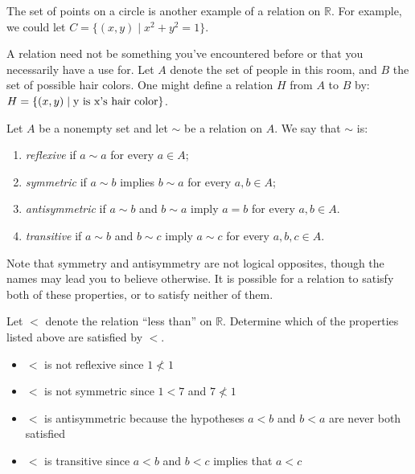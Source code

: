 \begin{example}
The set of points on a circle is another example of a relation on $\mathbb R$.  For example, we could let $C=\{(x,y)\mid x^2+y^2=1\}$.
\end{example}

\begin{example}
A relation need not be something you've encountered before or that you necessarily have a use for.  Let $A$ denote the set of people in this room, and $B$ the set of possible hair colors.  One might define a relation $H$ from $A$ to $B$ by: $H=\{ (x,y)\mid \hbox{y is x's hair color}\}$.
\end{example}

\begin{definition}
Let $A$ be a nonempty set and let $\sim$ be a relation on $A$.  We say that $\sim$ is:
\begin{enumerate}
\item \emph{reflexive} if $a\sim a$ for every $a\in A$;
\item \emph{symmetric} if $a\sim b$ implies $b\sim a$ for every $a,b\in A$;
\item \emph{antisymmetric} if $a\sim b$ and $b\sim a$ imply $a=b$ for every $a,b\in A$.
\item \emph{transitive} if $a\sim b$ and $b\sim c$ imply $a\sim c$ for every $a,b,c\in A$.
\end{enumerate}
\end{definition}

\noindent
Note that symmetry and antisymmetry are not logical opposites, though the names may lead you to believe otherwise. It is possible for a relation to satisfy both of these properties, or to satisfy neither of them.

\begin{example}
Let $<$ denote the relation ``less than'' on $\mathbb R$. Determine which of the properties listed above are satisfied by $<$.
\begin{itemize}
\item  $<$ is not reflexive since $1\not<1$  
\item $<$ is not symmetric since $1<7$ and $7\not<1$
\item $<$ is antisymmetric because the hypotheses $a<b$ and $b<a$ are never both satisfied
\item $<$ is transitive since $a<b$ and $b<c$ implies that $a<c$
\end{itemize}
\end{example}

